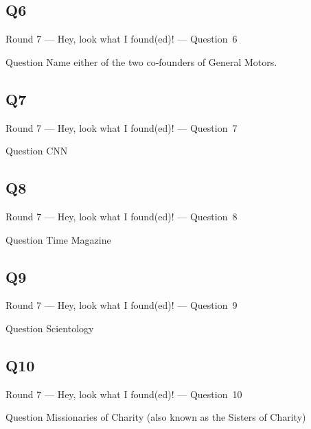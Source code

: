 \documentclass[11pt]{beamer}
\begin{document}
\subsection*{Q6}
\begin{frame}[t]{Round 7 --- Hey, look what I found(ed)! --- \mbox{Question 6}}
\vspace{-0.5em}
\begin{block}{Question}
Name either of the two co-founders of General Motors.
\end{block}
\end{frame}
\subsection*{Q7}
\begin{frame}[t]{Round 7 --- Hey, look what I found(ed)! --- \mbox{Question 7}}
\vspace{-0.5em}
\begin{block}{Question}
CNN
\end{block}
\end{frame}
\subsection*{Q8}
\begin{frame}[t]{Round 7 --- Hey, look what I found(ed)! --- \mbox{Question 8}}
\vspace{-0.5em}
\begin{block}{Question}
Time Magazine
\end{block}
\end{frame}
\subsection*{Q9}
\begin{frame}[t]{Round 7 --- Hey, look what I found(ed)! --- \mbox{Question 9}}
\vspace{-0.5em}
\begin{block}{Question}
Scientology
\end{block}
\end{frame}
\subsection*{Q10}
\begin{frame}[t]{Round 7 --- Hey, look what I found(ed)! --- \mbox{Question 10}}
\vspace{-0.5em}
\begin{block}{Question}
Missionaries of Charity (also known as the Sisters of Charity)
\end{block}
\end{frame}
\end{document}
